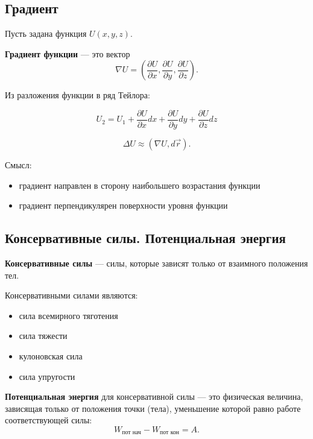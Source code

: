\documentclass[a4paper,12pt]{article}
\begin{document}
\vspace{0.8em}

\subsection*{Градиент}

Пусть задана функция $U(x,y,z)$.

\begin{definitionbox}
\textbf{Градиент функции} — это вектор
\[
\nabla U = \left( \frac{\partial U}{\partial x}, \frac{\partial U}{\partial y}, \frac{\partial U}{\partial z} \right).
\]
\end{definitionbox}

Из разложения функции в ряд Тейлора:

\[
U_2
=
U_1
+
\frac{\partial U}{\partial x} dx
+
\frac{\partial U}{\partial y} dy
+
\frac{\partial U}{\partial z} dz
\]

\[
\Delta U \approx (\nabla U, d\vec r).
\]

Смысл:
\begin{itemize}
\item градиент направлен в сторону наибольшего возрастания функции
\item градиент перпендикулярен поверхности уровня функции
\end{itemize}

\vspace{0.8em}

\subsection*{Консервативные силы. Потенциальная энергия}

\begin{definitionbox}
\textbf{Консервативные силы} — силы, которые зависят только от взаимного положения тел.
\end{definitionbox}

Консервативными силами являются:
\begin{itemize}
\item сила всемирного тяготения
\item сила тяжести
\item кулоновская сила
\item сила упругости
\end{itemize}

\begin{definitionbox}
\textbf{Потенциальная энергия} для консервативной силы — это физическая величина, зависящая только от положения точки (тела), уменьшение которой равно работе соответствующей силы:
\[
W_{\text{пот нач}} - W_{\text{пот кон}} = A.
\]
\end{definitionbox}
\end{document}
